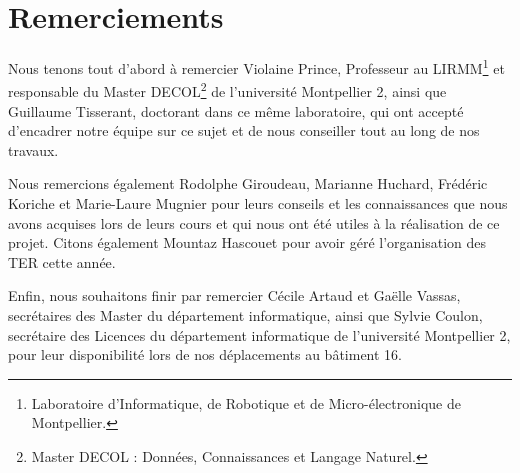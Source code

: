\chapter*{Remerciements}

Nous tenons tout d'abord à remercier \mbox{Violaine} \mbox{Prince}, Professeur au LIRMM\footnote{Laboratoire d'Informatique, de Robotique et de Micro-électronique de Montpellier.} et responsable du Master DECOL\footnote{Master DECOL : Données, Connaissances et Langage Naturel.} de l'université Montpellier 2, ainsi que \mbox{Guillaume} \mbox{Tisserant}, doctorant dans ce même laboratoire, qui ont accepté d'encadrer notre équipe sur ce sujet et de nous conseiller tout au long de nos travaux.

Nous remercions également \mbox{Rodolphe} \mbox{Giroudeau}, \mbox{Marianne} \mbox{Huchard}, \mbox{Frédéric} \mbox{Koriche} et \mbox{Marie-Laure} \mbox{Mugnier} pour leurs conseils et les connaissances que nous avons acquises lors de leurs cours et qui nous ont été utiles à la réalisation de ce projet. Citons également \mbox{Mountaz} \mbox{Hascouet} pour avoir géré l'organisation des TER cette année.

Enfin, nous souhaitons finir par remercier \mbox{Cécile} \mbox{Artaud} et \mbox{Gaëlle} \mbox{Vassas}, secrétaires des Master du département informatique, ainsi que \mbox{Sylvie} \mbox{Coulon}, secrétaire des Licences du département informatique de l'université Montpellier 2, pour leur disponibilité lors de nos déplacements au bâtiment 16.

